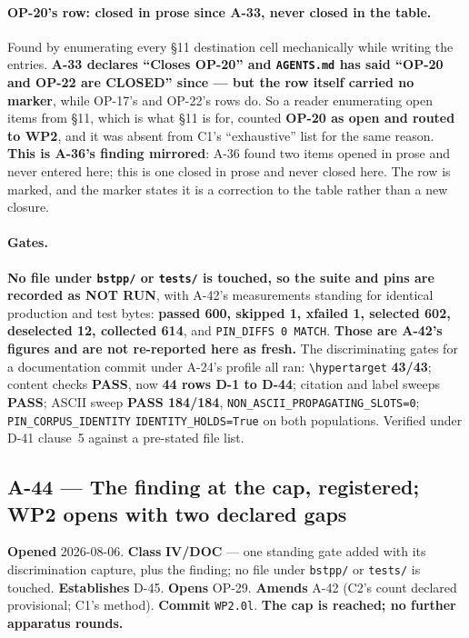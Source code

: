 \documentclass[
  10pt,
]{article}
\begin{document}
\paragraph{OP-20's row: closed in prose since A-33, never closed in the table.}
Found by enumerating every \S11 destination cell mechanically while writing the entries. \textbf{A-33 declares ``Closes OP-20'' and \texttt{AGENTS.md} has said ``OP-20 and OP-22 are CLOSED'' since --- but the row itself carried no marker}, while OP-17's and OP-22's rows do. So a reader enumerating open items from \S11, which is what \S11 is for, counted \textbf{OP-20 as open and routed to WP2}, and it was absent from C1's ``exhaustive'' list for the same reason. \textbf{This is A-36's finding mirrored}: A-36 found two items opened in prose and never entered here; this is one closed in prose and never closed here. The row is marked, and the marker states it is a correction to the table rather than a new closure.

\paragraph{Gates.}
\textbf{No file under \texttt{bstpp/} or \texttt{tests/} is touched, so the suite and pins are recorded as NOT RUN}, with A-42's measurements standing for identical production and test bytes: \textbf{passed 600, skipped 1, xfailed 1, selected 602, deselected 12, collected 614}, and \texttt{PIN\_DIFFS 0 MATCH}. \textbf{Those are A-42's figures and are not re-reported here as fresh.} The discriminating gates for a documentation commit under A-24's profile all ran: \texttt{\textbackslash hypertarget} \textbf{43/43}; content checks \textbf{PASS}, now \textbf{44 rows D-1 to D-44}; citation and label sweeps \textbf{PASS}; ASCII sweep \textbf{PASS 184/184}, \texttt{NON\_ASCII\_PROPAGATING\_SLOTS=0}; \texttt{PIN\_CORPUS\_IDENTITY} \texttt{IDENTITY\_HOLDS=True} on both populations. Verified under D-41 clause~5 against a pre-stated file list.

\hypertarget{a-44}{%
\subsection{A-44 --- The finding at the cap, registered; WP2 opens with two declared gaps}\label{a-44}}

\textbf{Opened} 2026-08-06. \textbf{Class} \textbf{IV/DOC} --- one standing gate added with its discrimination capture, plus the finding; no file under \texttt{bstpp/} or \texttt{tests/} is touched. \textbf{Establishes} D-45. \textbf{Opens} OP-29. \textbf{Amends} A-42 (C2's count declared provisional; C1's method). \textbf{Commit} \texttt{WP2.0l}. \textbf{The cap is reached; no further apparatus rounds.}
\end{document}
